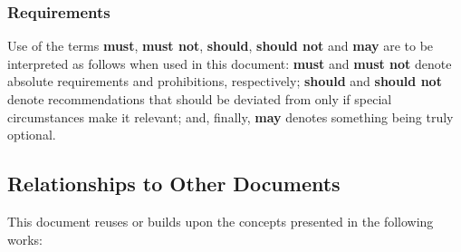 \subsubsection{Requirements}

Use of the terms \textbf{must}, \textbf{must not}, \textbf{should}, \textbf{should not} and \textbf{may} are to be interpreted as follows when used in this document: \textbf{must} and \textbf{must not} denote absolute requirements and prohibitions, respectively; \textbf{should} and \textbf{should not} denote recommendations that should be deviated from only if special circumstances make it relevant; and, finally, \textbf{may} denotes something being truly optional.

\newpage

\subsection{Relationships to Other Documents}
\label{sec:introduction:relationships}

This document reuses or builds upon the concepts presented in the following works:

